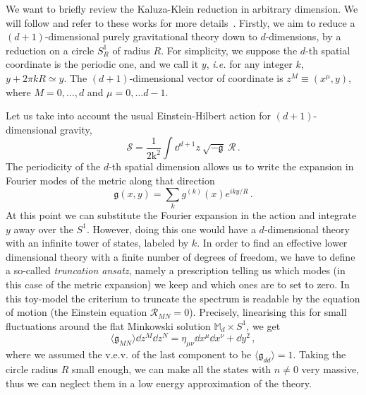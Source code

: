 \documentclass[debug]{phd}
\begin{document}
			We want to briefly review the Kaluza-Klein reduction in arbitrary dimension.
			We will follow and refer to these works for more details~\cite{stellereview, popeKK}.
			Firstly, we aim to reduce a $(d+1)$-dimensional purely gravitational theory down to $d$-dimensions, by a reduction on a circle $S^1_R$ of radius $R$.
			For simplicity, we suppose the $d$-th spatial coordinate is the periodic one, and we call it $y$, \emph{i.e.} for any integer $k$, $y + 2\pi k R \simeq y$.
			The $(d+1)$-dimensional vector of coordinate is $z^M \equiv (x^\mu , y)$, where $M = 0,\ldots, d$ and $\mu = 0, \ldots d-1$.
			
			Let us take into account the usual Einstein-Hilbert action for $(d+1)$-dimensional gravity,
					\begin{equation*}
						\mathcal{S} = \frac{1}{2 \mathrm{k}^2} \int \dd^{d+1}z\ \sqrt{-\mathfrak{g}}\ \mathcal{R} \, .
					\end{equation*}
			The periodicity of the $d$-th spatial dimension allows us to write the expansion in Fourier modes of the metric along that direction
					\begin{equation*}
						\mathfrak{g} (x, y) = \sum_{k} g^{(k)}(x) e^{i k y / R} \, .
					\end{equation*}
			At this point we can substitute the Fourier expansion in the action and integrate $y$ away over the $S^1$.
			However, doing this one would have a $d$-dimensional theory with an infinite tower of states, labeled by $k$.
			In order to find an effective lower dimensional theory with a finite number of degrees of freedom, we have to define a so-called \emph{truncation ansatz}, namely a prescription telling us which modes (in this case of the metric expansion) we keep and which ones are to set to zero.
			In this toy-model the criterium to truncate the spectrum is readable by the equation of motion (the Einstein equation $\mathcal{R}_{MN} = 0$).
			Precisely, linearising this for small fluctuations around the flat Minkowski solution $\mathbb{M}_{d} \times S^1$, we get
					\begin{equation*}
						\langle \mathfrak{g}_{MN} \rangle \dd z^M \dd z^N = \eta_{\mu\nu} \dd x^\mu \dd x^\nu + \dd y^2 \, , 
					\end{equation*}
			where we assumed the v.e.v. of the last component to be $\langle \mathfrak{g}_{dd} \rangle = 1$.
			Taking the circle radius $R$ small enough, we can make all the states with $n\neq 0$ very massive, thus we can neglect them in a low energy approximation of the theory.
\end{document}
